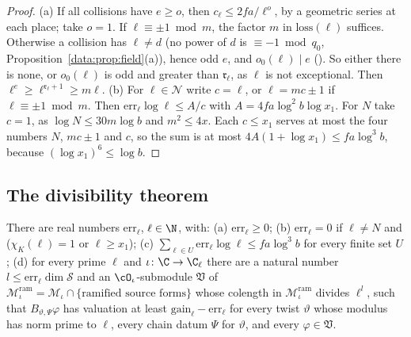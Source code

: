 \begin{proof}
(a) If all collisions have $e\ge o$, then $c_\ell\le2fa/\ell^o$, by a geometric series at each place;
take $o=1$. If $\ell\equiv\pm1\bmod m$, the factor $m$ in $\mathrm{loss}(\ell)$ suffices. Otherwise a
collision has $\ell\ne d$ (no power of $d$ is $\equiv-1\bmod q_0$,
Proposition~\ref{data:prop:field}(a)), hence odd $e$, and $o_0(\ell)\mid e$
(). So either there is none, or $o_0(\ell)$ is odd and greater
than $\mathfrak r_\ell$, as $\ell$ is not exceptional. Then $\ell^e\ge \ell^{\mathfrak r_\ell+1}\ge m\ell$.
(b) For $\ell\in\mathcal N$ write $c=\ell$, or $\ell=mc\pm1$ if $\ell\equiv\pm1\bmod m$. Then
$\mathrm{err}_\ell\log \ell\le A/c$ with $A=4fa\log^2b\log x_1$. For $N$ take $c=1$, as $\log N\le
30m\log b$ and $m^2\le4x$. Each $c\le x_1$ serves at most the four numbers $N$, $mc\pm1$ and $c$,
so the sum is at most $4A(1+\log x_1)\le fa\log^3b$, because $(\log x_1)^6\le\log b$.
\end{proof}

\subsection{The divisibility theorem}

\begin{theorem}
\label{ub-divis:thm:divis}
There are real numbers $\mathrm{err}_\ell$, $\ell\in\N$, with:
(a) $\mathrm{err}_\ell\ge0$;
(b) $\mathrm{err}_\ell=0$ if $\ell\ne N$ and ($\chi_K(\ell)=1$ or $\ell\ge x_1$);
(c) $\sum_{\ell\in U}\mathrm{err}_\ell\log \ell\le fa\log^3b$ for every finite set $U$;
(d) for every prime $\ell$ and $\iota\colon\C\to\C_\ell$ there are a natural number $l\le\mathrm{err}_\ell\dim\mathcal S$
and an $\cO_\iota$-submodule $\mathfrak V$ of $\mathcal M_\iota^{\mathrm{ram}}=\mathcal
M_\iota\cap\{\text{ramified source forms}\}$ whose colength in $\mathcal M^{\mathrm{ram}}_\iota$
divides $\ell^l$, such that $B_{\vartheta,\Psi}\varphi$ has valuation at least
$\mathrm{gain}_\ell-\mathrm{err}_\ell$ for every twist $\vartheta$ whose modulus has norm
prime to $\ell$, every chain datum $\Psi$ for $\vartheta$, and every $\varphi\in\mathfrak V$.
\end{theorem}

